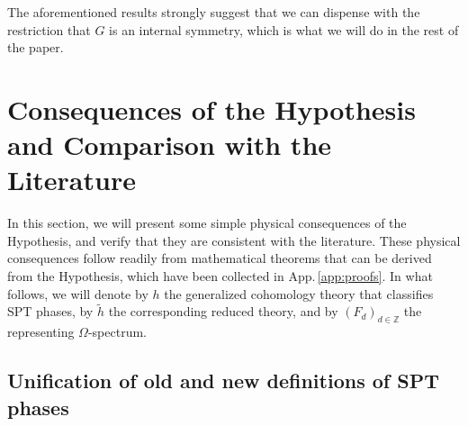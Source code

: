 \documentclass[sort&compress]{elsarticle}
\theoremstyle{theoremstyle}
\theoremstyle{framedtheoremstyle}
\theoremstyle{definitionstyle}
\theoremstyle{definitionstyle}
\theoremstyle{definitionstyle}
\theoremstyle{definitionstyle}
\theoremstyle{nameddefinitionstyle}
\theoremstyle{framednameddefinitionstyle}
\theoremstyle{proofstyle}
\theoremstyle{definitionstyle}
\newcommand{\ZZZ}{\mathbb{Z}}
\newcommand{\paren}[1]{\left( #1 \right)}
\begin{document}
The aforementioned results strongly suggest that we can dispense with the restriction that $G$ is an internal symmetry, which is what we will do in the rest of the paper.









\section{Consequences of the Hypothesis and Comparison with the Literature \label{sec:consequences_hypothesis_physical_implications}}

In this section, we will present some simple physical consequences of the Hypothesis, and verify that they are consistent with the literature. These physical consequences follow readily from mathematical theorems that can be derived from the Hypothesis, which have been collected in App.\,\ref{app:proofs}.
In what follows, we will denote by $h$ the generalized cohomology theory that classifies SPT phases, by $\tilde h$ the corresponding reduced theory, and by $\paren{F_d}_{d\in \ZZZ}$ the representing $\Omega$-spectrum.









\subsection{Unification of old and new definitions of SPT phases \label{subsec:unification_old_new_definitions_SPT_phases}}
\end{document}
